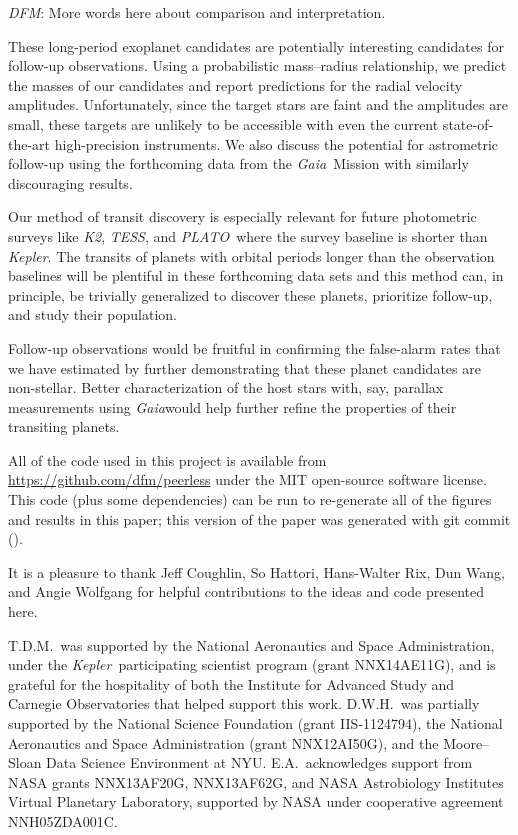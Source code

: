 \documentclass[manuscript, letterpaper]{aastex6}
\newcommand{\project}[1]{\textsl{#1}}
\newcommand{\kepler}{\project{Kepler}}
\newcommand{\KT}{\project{K2}}
\newcommand{\tess}{\project{TESS}}
\newcommand{\plato}{\project{PLATO}}
\newcommand{\gaia}{\project{Gaia}}
\newcommand{\todo}[3]{{\color{#2}\emph{#1}: #3}}
\newcommand{\dfmtodo}[1]{\todo{DFM}{red}{#1}}
\newcommand{\paper}{paper}
\begin{document}
\dfmtodo{More words here about comparison and interpretation.}

These long-period exoplanet candidates are potentially interesting candidates
for follow-up observations.
Using a probabilistic mass--radius relationship, we predict the masses of our
candidates and report predictions for the radial velocity amplitudes.
Unfortunately, since the target stars are faint and the amplitudes are small,
these targets are unlikely to be accessible with even the current
state-of-the-art high-precision instruments.
We also discuss the potential for astrometric follow-up using the forthcoming
data from the \gaia\ Mission with similarly discouraging results.

Our method of transit discovery is especially relevant for future photometric
surveys like \KT, \tess, and \plato\ where the survey baseline is shorter than
\kepler.
The transits of planets with orbital periods longer than the observation
baselines will be plentiful in these forthcoming data sets and this method
can, in principle, be trivially generalized to discover these planets,
prioritize follow-up, and study their population.

Follow-up observations would be fruitful in confirming the false-alarm
rates that we have estimated by further demonstrating that these planet
candidates are non-stellar.  Better characterization of the host stars with,
say, parallax measurements using \gaia would help further refine the
properties of their transiting planets.

\vspace{1.5em}
All of the code used in this project is available from
\url{https://github.com/dfm/peerless} under the MIT open-source software
license.
This code (plus some dependencies) can be run to re-generate all of the
figures and results in this \paper; this version of the paper was generated
with git commit \texttt{\githash} (\gitdate).


\acknowledgments
It is a pleasure to thank
Jeff Coughlin,
So Hattori,
Hans-Walter Rix,
Dun Wang,
and
Angie Wolfgang
for helpful contributions to the ideas and code presented here.

T.D.M.\ was supported by the National Aeronautics and Space
Administration, under the \kepler\ participating
scientist program (grant NNX14AE11G), and is grateful for the
hospitality of both the Institute for Advanced Study and Carnegie
Observatories that helped support this work.
D.W.H.\ was partially supported by the National Science Foundation (grant
IIS-1124794), the National Aeronautics and Space Administration (grant
NNX12AI50G), and the Moore--Sloan Data Science Environment at NYU.
E.A.\ acknowledges support from NASA grants NNX13AF20G, NNX13AF62G, and NASA
Astrobiology Institutes Virtual Planetary Laboratory, supported by NASA under
cooperative agreement NNH05ZDA001C.
\end{document}
